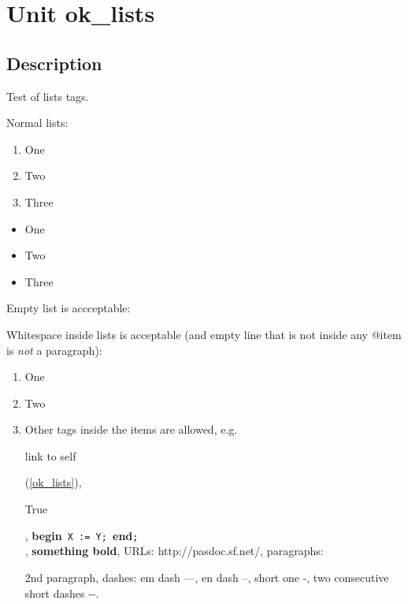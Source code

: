 \documentclass{report}
\begin{document}
\newlength{\tmplength}
\chapter{Unit ok{\_}lists}
\section{Description}
Test of lists tags.\hfill\vspace*{1ex}



Normal lists: \begin{enumerate}
\setcounter{enumi}{0} \setcounter{enumii}{0} \setcounter{enumiii}{0} \setcounter{enumiv}{0} 
\item One
\setcounter{enumi}{1} \setcounter{enumii}{1} \setcounter{enumiii}{1} \setcounter{enumiv}{1} 
\item Two
\setcounter{enumi}{2} \setcounter{enumii}{2} \setcounter{enumiii}{2} \setcounter{enumiv}{2} 
\item Three
\end{enumerate} \begin{itemize}
\item One
\item Two
\item Three
\end{itemize}

Empty list is accceptable:  

Whitespace inside lists is acceptable (and empty line that is not inside any @item is \textit{not} a paragraph): \begin{enumerate}
\setcounter{enumi}{0} \setcounter{enumii}{0} \setcounter{enumiii}{0} \setcounter{enumiv}{0} 
\item One
\setcounter{enumi}{1} \setcounter{enumii}{1} \setcounter{enumiii}{1} \setcounter{enumiv}{1} 
\item Two
\setcounter{enumi}{2} \setcounter{enumii}{2} \setcounter{enumiii}{2} \setcounter{enumiv}{2} 
\item  Other tags inside the items are allowed, e.g. \begin{ttfamily}link to self\end{ttfamily}(\ref{ok_lists}), \begin{ttfamily}True\end{ttfamily}, \texttt{}\textbf{begin}\texttt{~X~:=~Y;~}\textbf{end}\texttt{;\\
}, \textbf{something bold}, URLs: http://pasdoc.sf.net/, paragraphs:

2nd paragraph, dashes: em dash ---, en dash --, short one {-}, two consecutive short dashes {-}{-}. 
\end{enumerate}
\end{document}
